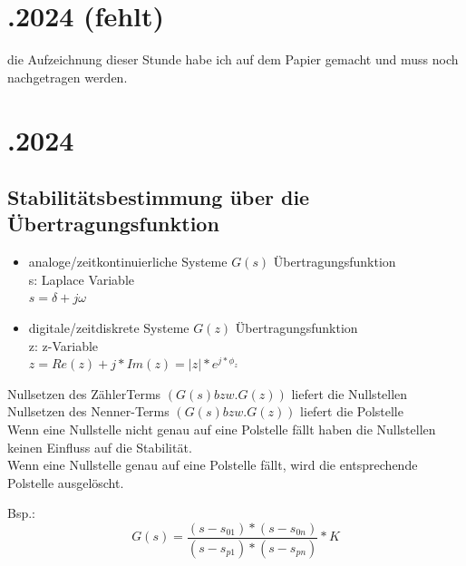 \documentclass[a4paper]{article}
\begin{document}
\newpage
\section*{.2024 (fehlt)}
die Aufzeichnung dieser Stunde habe ich auf dem Papier gemacht und muss noch nachgetragen werden.

\newpage
\section*{.2024}
\subsection*{Stabilitätsbestimmung über die Übertragungsfunktion}
\begin{itemize}
	\item analoge/zeitkontinuierliche Systeme $G(s)$ Übertragungsfunktion \\
	s: Laplace Variable \\
	$s=\delta+j\omega$
	\item digitale/zeitdiskrete Systeme $G(z)$ Übertragungsfunktion \\
	z: z-Variable \\
	$z=Re(z) + j * Im(z) = |z| * e^{j*\phi_z} $
\end{itemize}
Nullsetzen des ZählerTerms $(G(s) bzw. G(z))$ liefert die Nullstellen \\
Nullsetzen des Nenner-Terms $(G(s) bzw. G(z))$ liefert die Polstelle \\
Wenn eine Nullstelle nicht genau auf eine Polstelle fällt haben die Nullstellen keinen Einfluss auf die Stabilität. \\
Wenn eine Nullstelle genau auf eine Polstelle fällt, wird die entsprechende Polstelle ausgelöscht.
\begin{center}
Bsp.:
\[
G(s) = \frac{ (s-s_{01}) * (s-s_{0n}) }{ (s-s_{p1}) * (s-s_{pn}) }*K
\]
\end{center}
\end{document}
